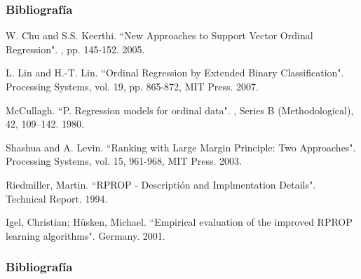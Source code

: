 \documentclass[compress,allowframebreaks]{beamer}
\begin{document}
		\begin{frame}[allowframebreaks]
			\frametitle{\normalsize Bibliografía}
			
			\begin{thebibliography}{10}
					W. Chu and S.S. Keerthi.
					\newblock ``New Approaches to Support Vector Ordinal Regression".
					, pp. 145-152.
					2005.
				
					L. Lin and H.-T. Lin.
					\newblock ``Ordinal Regression by Extended Binary Classification".
					 Processing Systems, vol. 19, pp. 865-872, MIT Press.
					2007.
	
					McCullagh.
					\newblock ``P. Regression models for ordinal data".
					, Series B (Methodological), 42, 109–142.
					1980.

					Shashua and A. Levin.
					\newblock ``Ranking with Large Margin Principle: Two Approaches".
					 Processing Systems, vol. 15, 961-968, MIT Press.
					2003.

					Riedmiller, Martin.
					\newblock ``RPROP - Descriptión and Implmentation Details".
					 Technical Report.
					1994.

					Igel, Christian; Hüsken, Michael.
					\newblock ``Empirical evaluation of the improved RPROP learning algorithms".
					 Germany.
					2001.
			\end{thebibliography}

			\frametitle{\normalsize Bibliografía}
		\end{frame}
\end{document}
